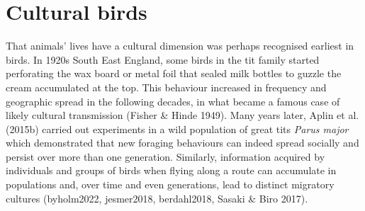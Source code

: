 \section{Cultural birds}
That animals’ lives have a cultural dimension was perhaps recognised earliest in birds. In 1920s South East England, some birds in the tit family started perforating the wax board or metal foil that sealed milk bottles to guzzle the cream accumulated at the top. This behaviour increased in frequency and geographic spread in the following decades, in what became a famous case of likely cultural transmission (Fisher \& Hinde 1949). Many years later, Aplin et al. (2015b) carried out experiments in a wild population of great tits \textit{Parus major} which demonstrated that new foraging behaviours can indeed spread socially and persist over more than one generation. Similarly, information acquired by individuals and groups of birds when flying along a route can accumulate in populations and, over time and even generations, lead to distinct migratory cultures (byholm2022, jesmer2018, berdahl2018, Sasaki \& Biro 2017).

